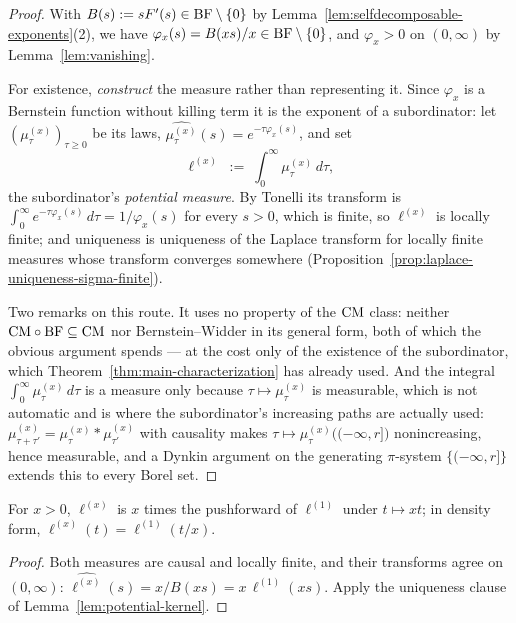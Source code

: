 \begin{proof}
With $B(s) := sF'(s) \in \mathrm{BF} \setminus \{0\}$ by
Lemma~\ref{lem:selfdecomposable-exponents}(2), we have
$\varphi_x(s) = B(xs)/x \in \mathrm{BF} \setminus \{0\}$, and $\varphi_x > 0$ on $(0,\infty)$ by
Lemma~\ref{lem:vanishing}.

For existence, \emph{construct} the measure rather than representing it. Since $\varphi_x$ is
a Bernstein function without killing term it is the exponent of a subordinator: let
$(\mu^{(x)}_\tau)_{\tau \ge 0}$ be its laws,
$\widehat{\mu^{(x)}_\tau}(s) = e^{-\tau \varphi_x(s)}$, and set
\[
  \ell^{(x)} \;:=\; \int_0^\infty \mu^{(x)}_\tau \, d\tau,
\]
the subordinator's \emph{potential measure}. By Tonelli its transform is
$\int_0^\infty e^{-\tau\varphi_x(s)}\,d\tau = 1/\varphi_x(s)$ for every $s > 0$, which is
finite, so $\ell^{(x)}$ is locally finite; and uniqueness is uniqueness of the Laplace
transform for locally finite measures whose transform converges somewhere
(Proposition~\ref{prop:laplace-uniqueness-sigma-finite}).

Two remarks on this route. It uses no property of the $\mathrm{CM}$ class: neither
$\mathrm{CM} \circ \mathrm{BF} \subseteq \mathrm{CM}$ nor Bernstein--Widder in its general form, both of which the
obvious argument spends --- at the cost only of the existence of the subordinator, which
Theorem~\ref{thm:main-characterization} has already used. And the integral
$\int_0^\infty \mu^{(x)}_\tau\,d\tau$ is a measure only because
$\tau \mapsto \mu^{(x)}_\tau$ is measurable, which is not automatic and is where the
subordinator's increasing paths are actually used:
$\mu^{(x)}_{\tau+\tau'} = \mu^{(x)}_\tau * \mu^{(x)}_{\tau'}$ with causality makes
$\tau \mapsto \mu^{(x)}_\tau\bigl((-\infty, r]\bigr)$ nonincreasing, hence measurable, and a
Dynkin argument on the generating $\pi$-system $\{(-\infty,r]\}$ extends this to every Borel
set.
\end{proof}

\begin{lemma}\label{lem:potential-kernel-scaling}
For $x > 0$, $\ell^{(x)}$ is $x$ times the pushforward of $\ell^{(1)}$ under $t \mapsto xt$;
in density form, $\ell^{(x)}(t) = \ell^{(1)}(t/x)$.
\end{lemma}

\begin{proof}
Both measures are causal and locally finite, and their transforms agree on $(0,\infty)$:
$\widehat{\ell^{(x)}}(s) = x/B(xs) = x\,\widehat{\ell^{(1)}}(xs)$. Apply the uniqueness clause
of Lemma~\ref{lem:potential-kernel}.
\end{proof}

